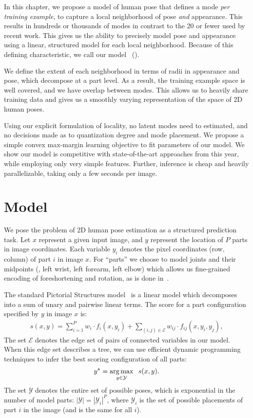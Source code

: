  In this chapter, we propose a model of human pose that 
defines a mode {\em per training example}, to capture a local neighborhood of
pose {\em and } appearance.  This results in hundreds or thousands of modes in 
contrast to the 20 or fewer used by recent work. This gives us the ability to 
precisely model pose and appearance using a linear, structured model for each 
local neighborhood.  Because of this defining characteristic, we call our model 
\LLPSlong~(\LLPS).

We define the extent of each neighborhood in terms of radii in appearance and 
pose, which decompose at a part level.  As a result, the training example space 
is well covered, and we have overlap between modes.  This allows us to heavily 
share training data and gives us a smoothly varying representation of the space 
of 2D human poses.

Using our explicit formulation of locality, no latent modes need to estimated, 
and no decisions made as to quantization degree and mode placement.  We propose 
a simple convex max-margin learning objective to fit parameters of our model.  
We show our model is competitive with state-of-the-art approaches from this 
year, while employing only very simple features. Further, inference is cheap 
and heavily parallelizable, taking only a few seconds per image.


\section{Model}\label{sec:model}

We pose the problem of 2D human pose estimation as a structured prediction task.  Let $x$ represent a given input image, and $y$ represent the location of $P$ parts in image coordinates.  Each variable $y_i$ denotes the pixel coordinates (row, column) of part $i$ in image $x$.  For ``parts'' we choose to model joints and their midpoints (\eg, left wrist, left forearm, left elbow) which allows us fine-grained encoding of foreshortening and rotation, as is done in~\cite{deva2011,sapp2011}.

The standard Pictorial Structures model~\cite{felzps} is a linear model which decomposes into a sum of unary and pairwise linear terms.  The score for a part configuration specified by $y$ in image $x$ is:
\begin{align}
 s(x,y) = \sum_{i=1}^P w_i \cdot f_i(x,y_i) + \sum_{(i,j) \in \mathcal{E}} w_{ij} \cdot f_{ij}(x,y_i,y_j),
 \label{eqn:ps}
 \end{align}
The set $\mathcal{E}$ denotes the edge set of pairs of connected variables in our model.  When this edge set describes a tree, we can use efficient dynamic programming techniques to infer the best scoring configuration of all parts:
\begin{align}
y^\star = \mathop{\arg\max}_{y \in \mathcal{Y}} \;\;s(x,y).
\end{align}
The set $\mathcal{Y}$ denotes the entire set of possible poses, which is exponential in the number of model parts: $|\mathcal{Y}| = |\mathcal{Y}_i|^P$, where $\mathcal{Y}_i$ is the set of possible placements of part $i$ in the image (and is the same for all $i$).

